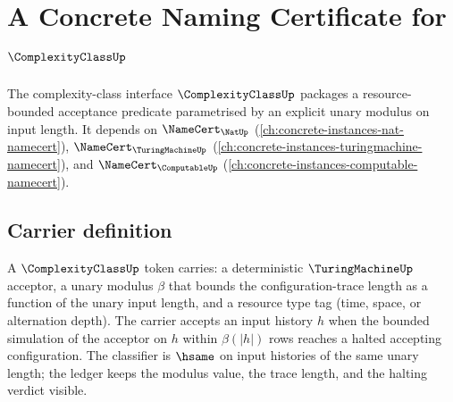 \chapter{A Concrete Naming Certificate for $\ComplexityClassUp$}
\label{ch:concrete-instances-complexityclass-namecert}

The complexity-class interface $\ComplexityClassUp$ packages a resource-bounded acceptance predicate parametrised by an explicit unary modulus on input length. It depends on $\NameCert_{\NatUp}$ (\autoref{ch:concrete-instances-nat-namecert}), $\NameCert_{\TuringMachineUp}$ (\autoref{ch:concrete-instances-turingmachine-namecert}), and $\NameCert_{\ComputableUp}$ (\autoref{ch:concrete-instances-computable-namecert}).

\section{Carrier definition}
\label{sec:complexityclass-carrier}

A $\ComplexityClassUp$ token carries: a deterministic $\TuringMachineUp$ acceptor, a unary modulus $\beta$ that bounds the configuration-trace length as a function of the unary input length, and a resource type tag (time, space, or alternation depth). The carrier accepts an input history $h$ when the bounded simulation of the acceptor on $h$ within $\beta(|h|)$ rows reaches a halted accepting configuration. The classifier is $\hsame$ on input histories of the same unary length; the ledger keeps the modulus value, the trace length, and the halting verdict visible.

